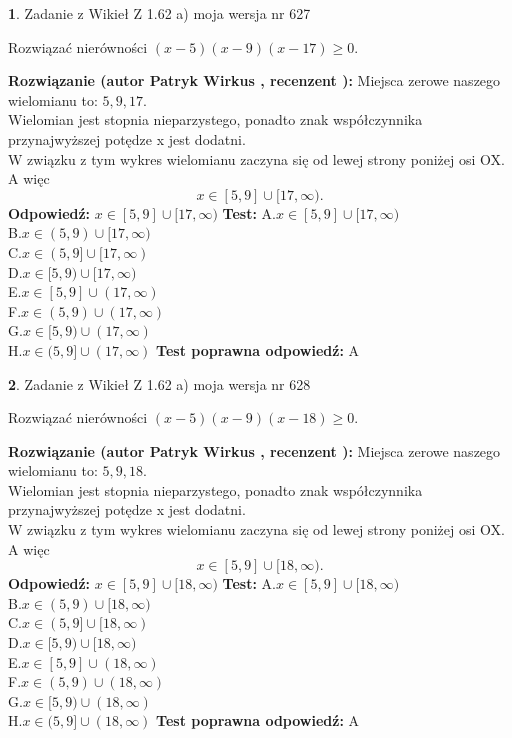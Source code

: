 \documentclass[12pt, a4paper]{article}
\theoremstyle{definition} %
\newtheorem{zad}{}
\newcommand{\zadStart}[1]{\begin{zad}#1\newline}
\newcommand{\zadStop}{\end{zad}}
\newcommand{\rozwStart}[2]{\noindent \textbf{Rozwiązanie (autor #1 , recenzent #2): }\newline}
\newcommand{\rozwStop}{\newline}
\newcommand{\odpStart}{\noindent \textbf{Odpowiedź:}\newline}
\newcommand{\odpStop}{\newline}
\newcommand{\testStart}{\noindent \textbf{Test:}\newline}
\newcommand{\testStop}{\newline}
\newcommand{\kluczStart}{\noindent \textbf{Test poprawna odpowiedź:}\newline}
\newcommand{\kluczStop}{\newline}
\begin{document}
\zadStart{Zadanie z Wikieł Z 1.62 a) moja wersja nr 627}

Rozwiązać nierówności $(x-5)(x-9)(x-17)\ge0$.
\zadStop
\rozwStart{Patryk Wirkus}{}
Miejsca zerowe naszego wielomianu to: $5, 9, 17$.\\
Wielomian jest stopnia nieparzystego, ponadto znak współczynnika przy\linebreak najwyższej potędze x jest dodatni.\\ W związku z tym wykres wielomianu zaczyna się od lewej strony poniżej osi OX. A więc $$x \in [5,9] \cup [17,\infty).$$
\rozwStop
\odpStart
$x \in [5,9] \cup [17,\infty)$
\odpStop
\testStart
A.$x \in [5,9] \cup [17,\infty)$\\
B.$x \in (5,9) \cup [17,\infty)$\\
C.$x \in (5,9] \cup [17,\infty)$\\
D.$x \in [5,9) \cup [17,\infty)$\\
E.$x \in [5,9] \cup (17,\infty)$\\
F.$x \in (5,9) \cup (17,\infty)$\\
G.$x \in [5,9) \cup (17,\infty)$\\
H.$x \in (5,9] \cup (17,\infty)$
\testStop
\kluczStart
A
\kluczStop



\zadStart{Zadanie z Wikieł Z 1.62 a) moja wersja nr 628}

Rozwiązać nierówności $(x-5)(x-9)(x-18)\ge0$.
\zadStop
\rozwStart{Patryk Wirkus}{}
Miejsca zerowe naszego wielomianu to: $5, 9, 18$.\\
Wielomian jest stopnia nieparzystego, ponadto znak współczynnika przy\linebreak najwyższej potędze x jest dodatni.\\ W związku z tym wykres wielomianu zaczyna się od lewej strony poniżej osi OX. A więc $$x \in [5,9] \cup [18,\infty).$$
\rozwStop
\odpStart
$x \in [5,9] \cup [18,\infty)$
\odpStop
\testStart
A.$x \in [5,9] \cup [18,\infty)$\\
B.$x \in (5,9) \cup [18,\infty)$\\
C.$x \in (5,9] \cup [18,\infty)$\\
D.$x \in [5,9) \cup [18,\infty)$\\
E.$x \in [5,9] \cup (18,\infty)$\\
F.$x \in (5,9) \cup (18,\infty)$\\
G.$x \in [5,9) \cup (18,\infty)$\\
H.$x \in (5,9] \cup (18,\infty)$
\testStop
\kluczStart
A
\kluczStop
\end{document}

